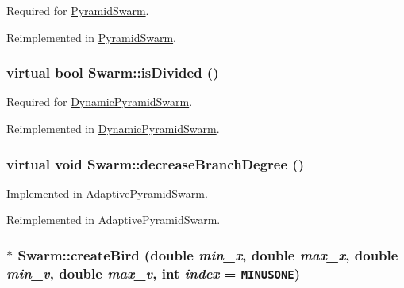 Required for \hyperlink{classPyramidSwarm}{PyramidSwarm}. 



Reimplemented in \hyperlink{classPyramidSwarm_9372ad747da64c8f3fd904da02c36d41}{PyramidSwarm}.\hypertarget{classSwarm_75d0b85dc6fa2ec069f1580e0386faee}{
\subsubsection{\setlength{\rightskip}{0pt plus 5cm}virtual bool Swarm::isDivided ()}}
\label{classSwarm_75d0b85dc6fa2ec069f1580e0386faee}


Required for \hyperlink{classDynamicPyramidSwarm}{DynamicPyramidSwarm}. 



Reimplemented in \hyperlink{classDynamicPyramidSwarm_65efd123a0e770211a47fd384c36af12}{DynamicPyramidSwarm}.\hypertarget{classSwarm_be7aff8e0df635ac00082fd6cd418356}{
\subsubsection{\setlength{\rightskip}{0pt plus 5cm}virtual void Swarm::decreaseBranchDegree ()}}
\label{classSwarm_be7aff8e0df635ac00082fd6cd418356}


Implemented in \hyperlink{classAdaptivePyramidSwarm}{AdaptivePyramidSwarm}. 



Reimplemented in \hyperlink{classAdaptivePyramidSwarm_1882a87c019b03a0e39cde841f598aaf}{AdaptivePyramidSwarm}.\hypertarget{classSwarm_96527c398560529a5e3bf7cb4c2f5886}{
\subsubsection{ $\ast$ Swarm::createBird (double {\em min\_\-x}, \/  double {\em max\_\-x}, \/  double {\em min\_\-v}, \/  double {\em max\_\-v}, \/  int {\em index} = {\tt {\bf MINUSONE}})}}
\label{classSwarm_96527c398560529a5e3bf7cb4c2f5886}


